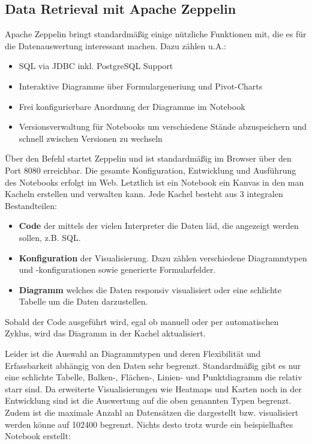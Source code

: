 \subsection{Data Retrieval mit Apache Zeppelin}
Apache Zeppelin bringt standardmäßig einige nützliche Funktionen mit, die es für die Datenauswertung interessant machen. Dazu zählen u.A.:
\begin{itemize}
	\item SQL via JDBC inkl. PostgreSQL Support
	\item Interaktive Diagramme über Formulargeneriung und Pivot-Charts
	\item Frei konfigurierbare Anordnung der Diagramme im Notebook
	\item Versionsverwaltung für Notebooks um verschiedene Stände abzuspeichern und schnell zwischen Versionen zu wechseln
\end{itemize}

Über den Befehl  startet Zeppelin und ist standardmäßig im Browser über den Port 8080 erreichbar. Die gesamte Konfiguration, Entwicklung und Ausführung des Notebooks erfolgt im Web. Letztlich ist ein Notebook ein Kanvas in den man Kacheln erstellen und verwalten kann. Jede Kachel besteht aus 3 integralen Bestandteilen:
\begin{itemize}
	\item \textbf{Code} der mittels der vielen Interpreter die Daten läd, die angezeigt werden sollen, z.B. SQL.
	\item \textbf{Konfiguration} der Visualisierung. Dazu zählen verschiedene Diagrammtypen und -konfigurationen sowie generierte Formularfelder. 
	\item \textbf{Diagramm} welches die Daten responsiv visualisiert oder eine schlichte Tabelle um die Daten darzustellen.
\end{itemize}

Sobald der Code ausgeführt wird, egal ob manuell oder per automatischen Zyklus, wird das Diagramm in der Kachel aktualisiert.


Leider ist die Auswahl an Diagrammtypen und deren Flexibilität und Erfassbarkeit abhängig von den Daten sehr begrenzt. Standardmäßig gibt es nur eine schlichte Tabelle, Balken-, Flächen-, Linien- und Punktdiagramm die relativ starr sind. Da erweiterte Visualisierungen wie Heatmaps und Karten noch in der Entwicklung sind ist die Auswertung auf die oben genannten Typen begrenzt. Zudem ist die maximale Anzahl an Datensätzen die dargestellt bzw. visualisiert werden könne auf 102400 begrenzt. Nichts desto trotz wurde ein beispielhaftes Notebook erstellt:

